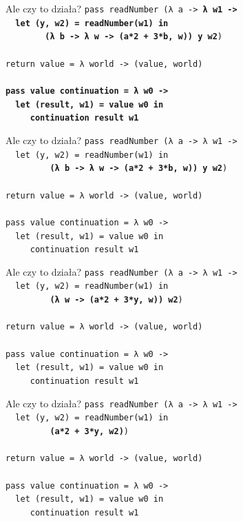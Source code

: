 \documentclass{beamer}
\begin{document}
\begin{frame}{Ale czy to działa?}
  \texttt{pass readNumber (λ a -> \textbf{λ w1 -> \\
      \ \ let (y, w2) = readNumber(w1) in\\
      \ \ \ \ \ \ \ \ (λ b -> λ w -> (a*2 + 3*b, w)) y w2})\\
    \ \\
    return value = λ world -> (value, world) \\
    \ \\
    \textbf{pass value continuation = λ w0 -> \\
      \ \ let (result, w1) = value w0 in \\
      \ \ \ \ \ continuation result w1}
  }
\end{frame}

\begin{frame}{Ale czy to działa?}
  \texttt{pass readNumber (λ a -> λ w1 -> \\
    \ \ let (y, w2) = readNumber(w1) in\\
    \ \ \ \ \ \ \ \ \ \textbf{(λ b -> λ w -> (a*2 + 3*b, w)) y w2})\\
    \ \\
    return value = λ world -> (value, world) \\
    \ \\
    pass value continuation = λ w0 -> \\
    \ \ let (result, w1) = value w0 in \\
    \ \ \ \ \ continuation result w1
  }
\end{frame}

\begin{frame}{Ale czy to działa?}
  \texttt{pass readNumber (λ a -> λ w1 -> \\
    \ \ let (y, w2) = readNumber(w1) in\\
    \ \ \ \ \ \ \ \ \ \textbf{(λ w -> (a*2 + 3*y, w)) w2})\\
    \ \\
    return value = λ world -> (value, world) \\
    \ \\
    pass value continuation = λ w0 -> \\
    \ \ let (result, w1) = value w0 in \\
    \ \ \ \ \ continuation result w1
  }
\end{frame}

\begin{frame}{Ale czy to działa?}
  \texttt{pass readNumber (λ a -> λ w1 -> \\
    \ \ let (y, w2) = readNumber(w1) in\\
    \ \ \ \ \ \ \ \ \ \textbf{(a*2 + 3*y, w2)})\\
    \ \\
    return value = λ world -> (value, world) \\
    \ \\
    pass value continuation = λ w0 -> \\
    \ \ let (result, w1) = value w0 in \\
    \ \ \ \ \ continuation result w1
  }
\end{frame}
\end{document}
